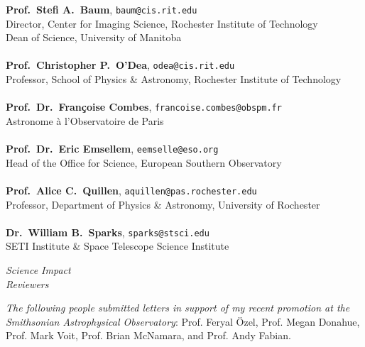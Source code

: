\documentclass[11pt]{article}
\begin{document}
{\textbf{Prof.~Stefi A.~Baum}, \texttt{baum@cis.rit.edu}\\
Director, Center for Imaging Science, Rochester Institute of Technology\\
Dean of Science, University of Manitoba\\ \\
\textbf{Prof.~Christopher P.~O'Dea}, \texttt{odea@cis.rit.edu}\\
Professor, School of Physics \& Astronomy, Rochester Institute of Technology\\ \\
\textbf{Prof.~Dr.~Fran\c coise Combes}, \texttt{francoise.combes@obspm.fr}\\
Astronome \`a l'Observatoire de Paris\\ \\
\textbf{Prof.~Dr.~Eric Emsellem}, \texttt{eemselle@eso.org}\\
Head of the Office for Science, European Southern Observatory\\ \\
\textbf{Prof.~Alice C.~Quillen}, \texttt{aquillen@pas.rochester.edu}\\
Professor, Department of Physics \& Astronomy, University of Rochester\\ \\
\textbf{Dr.~William B.~Sparks}, \texttt{sparks@stsci.edu}\\
SETI Institute \& Space Telescope Science Institute\\
}

\vspace{4mm}



\hspace{2.5mm} \parbox{1.5in}{\textit{Science Impact \\ Reviewers\\}} \parbox{5.15in}{\textit{The following people submitted letters in support of my recent promotion at the Smithsonian Astrophysical Observatory}: Prof. Feryal \"{O}zel, Prof. Megan Donahue, Prof. Mark Voit, Prof. Brian McNamara, and Prof. Andy Fabian.}\\
\end{document}
